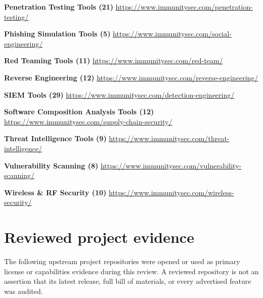 \documentclass[11pt,oneside]{report}
\begin{document}
\noindent\textbf{Penetration Testing Tools (21)} \hfill \url{https://www.immunitysec.com/penetration-testing/}\par
\noindent\textbf{Phishing Simulation Tools (5)} \hfill \url{https://www.immunitysec.com/social-engineering/}\par
\noindent\textbf{Red Teaming Tools (11)} \hfill \url{https://www.immunitysec.com/red-team/}\par
\noindent\textbf{Reverse Engineering (12)} \hfill \url{https://www.immunitysec.com/reverse-engineering/}\par
\noindent\textbf{SIEM Tools (29)} \hfill \url{https://www.immunitysec.com/detection-engineering/}\par
\noindent\textbf{Software Composition Analysis Tools (12)} \hfill \url{https://www.immunitysec.com/supply-chain-security/}\par
\noindent\textbf{Threat Intelligence Tools (9)} \hfill \url{https://www.immunitysec.com/threat-intelligence/}\par
\noindent\textbf{Vulnerability Scanning (8)} \hfill \url{https://www.immunitysec.com/vulnerability-scanning/}\par
\noindent\textbf{Wireless \& RF Security (10)} \hfill \url{https://www.immunitysec.com/wireless-security/}\par
\chapter{Reviewed project evidence}
The following upstream project repositories were opened or used as primary license or capabilities evidence during this review. A reviewed repository is not an assertion that its latest release, full bill of materials, or every advertised feature was audited.
\end{document}
